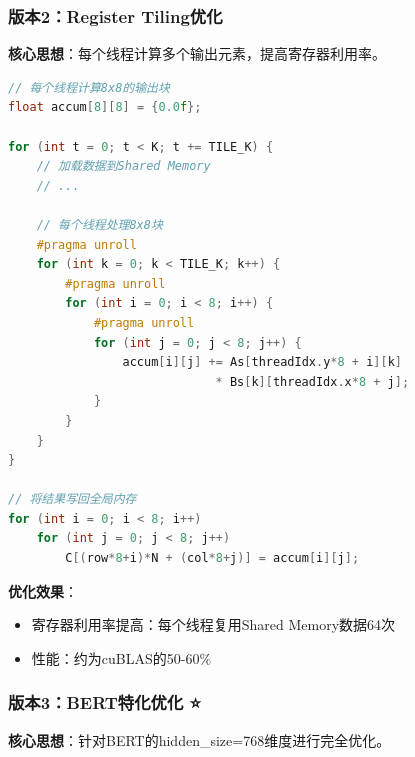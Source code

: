 \documentclass[12pt,a4paper]{article}
\begin{document}
\subsubsection{版本2：Register Tiling优化}

\textbf{核心思想}：每个线程计算多个输出元素，提高寄存器利用率。

\begin{lstlisting}[language=C++,caption=Register Tiling优化要点]
// 每个线程计算8x8的输出块
float accum[8][8] = {0.0f};

for (int t = 0; t < K; t += TILE_K) {
    // 加载数据到Shared Memory
    // ...
    
    // 每个线程处理8x8块
    #pragma unroll
    for (int k = 0; k < TILE_K; k++) {
        #pragma unroll
        for (int i = 0; i < 8; i++) {
            #pragma unroll
            for (int j = 0; j < 8; j++) {
                accum[i][j] += As[threadIdx.y*8 + i][k] 
                             * Bs[k][threadIdx.x*8 + j];
            }
        }
    }
}

// 将结果写回全局内存
for (int i = 0; i < 8; i++)
    for (int j = 0; j < 8; j++)
        C[(row*8+i)*N + (col*8+j)] = accum[i][j];
\end{lstlisting}

\textbf{优化效果}：
\begin{itemize}
    \item 寄存器利用率提高：每个线程复用Shared Memory数据64次
    \item 性能：约为cuBLAS的50-60\%
\end{itemize}

\subsubsection{版本3：BERT特化优化 ⭐}

\textbf{核心思想}：针对BERT的hidden\_size=768维度进行完全优化。
\end{document}
